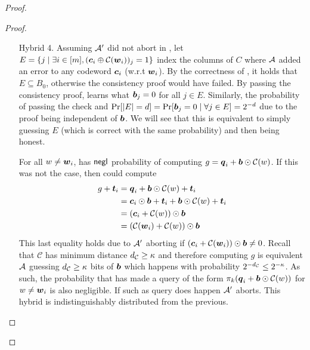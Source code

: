 \begin{proof}
\begin{proof}
\begin{enumerate}[leftmargin=1.8cm]
			
			\item[Hybrid 4.]\label{hybrid:simOutputR} Assuming $\mathcal{A}'$ did not abort in , let $E=\{j \mid \exists i\in[m], (\boldsymbol{c}_i\oplus \mathcal{C}(\boldsymbol{w}_i))_j = 1\}$ index the columns of $C$ where $\mathcal{A}$ added an error to any codeword $\boldsymbol{c}_i$ (w.r.t $\boldsymbol{w}_i$). By the correctness of , it holds that $E\subseteq B_0$, otherwise the consistency proof would have failed. By passing the consistency proof, \Adv learns what $\boldsymbol{b}_j=0$ for all $j\in E$. Similarly, the probability of passing the check and $\Pr[|E|=d]=\Pr[\boldsymbol{b}_j=0 \mid \forall j\in E]=2^{-d}$ due to the proof being independent of $\boldsymbol{b}$. We will see that this is equivalent to \Adv simply guessing $E$ (which is correct with the same probability) and then being honest. 
			
			For all $w\neq \boldsymbol{w}_i$, \Adv  has $\mathsf{negl}$ probability of computing $g=\boldsymbol{q}_i+\boldsymbol{b}\odot \mathcal{C}(w)$. If this was not the case, then \Adv  could compute
			\begin{align*}
			g +\boldsymbol{t}_i &=\boldsymbol{q}_i+\boldsymbol{b}\odot \mathcal{C}(w)+\boldsymbol{t}_i\\
			&=\boldsymbol{c}_i\odot\boldsymbol{b}+\boldsymbol{t}_i+\boldsymbol{b}\odot \mathcal{C}(w)+\boldsymbol{t}_i\\
			&=(\boldsymbol{c}_i+\mathcal{C}(w))\odot \boldsymbol{b}\\
			&=(\mathcal{C}(\boldsymbol{w}_i)+\mathcal{C}(w))\odot \boldsymbol{b}
			\end{align*}
			This last equality holds due to $\mathcal{A}'$ aborting if $(\boldsymbol{c}_i+\mathcal{C}(\boldsymbol{w}_i))\odot \boldsymbol{b}\neq 0$. Recall that $\mathcal{C}$ has minimum distance ${d_\mathcal{C}}\geq \kappa$ and therefore computing $g$ is equivalent $\mathcal{A}$ guessing ${d_\mathcal{C}}\geq \kappa$ bits of $\boldsymbol{b}$ which happens with probability $2^{-{d_\mathcal{C}}}\leq 2^{-\kappa}$.  As such, the probability that \Adv has made a query of the form $\pi_k(\boldsymbol{q}_i+\boldsymbol{b}\odot \mathcal{C}(w))$ for $w\neq \boldsymbol{w}_i$ is also negligible. If such as query does happen $\mathcal{A}'$ aborts. This hybrid is indistinguishably distributed from the previous. 
			
			
			

\end{enumerate}
\end{proof}
\end{proof}
